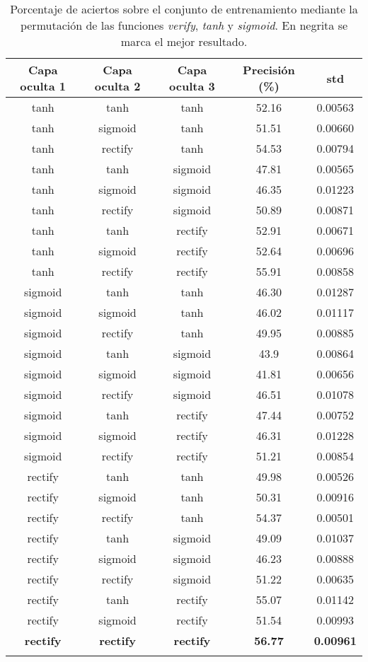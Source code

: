 \begin{table}[htp]
\caption{Porcentaje de aciertos sobre el conjunto de entrenamiento mediante la permutación de las funciones \textit{verify}, \textit{tanh} y \textit{sigmoid}. En negrita se marca el mejor resultado.}
\label{tab:nonlinearities}
\centering
\begin{tabular}{c c c c c}

\toprule
\textbf{Capa oculta 1} & \textbf{Capa oculta 2} & \textbf{Capa oculta 3} & \textbf{Precisión (\%)} & \textbf{std} \\
\midrule
tanh & tanh & tanh & 52.16 & 0.00563   \\
tanh & sigmoid & tanh & 51.51 & 0.00660   \\
tanh & rectify & tanh & 54.53 & 0.00794   \\
tanh & tanh & sigmoid & 47.81 & 0.00565   \\
tanh & sigmoid & sigmoid & 46.35 & 0.01223   \\
tanh & rectify & sigmoid & 50.89 & 0.00871   \\
tanh & tanh & rectify & 52.91 & 0.00671   \\
tanh & sigmoid & rectify & 52.64 & 0.00696   \\
tanh & rectify & rectify & 55.91 & 0.00858   \\
sigmoid & tanh & tanh & 46.30 & 0.01287   \\
sigmoid & sigmoid & tanh & 46.02 & 0.01117   \\
sigmoid & rectify & tanh & 49.95 & 0.00885   \\
sigmoid & tanh & sigmoid & 43.9 & 0.00864   \\
sigmoid & sigmoid & sigmoid & 41.81 & 0.00656   \\
sigmoid & rectify & sigmoid & 46.51 & 0.01078   \\
sigmoid & tanh & rectify & 47.44 & 0.00752   \\
sigmoid & sigmoid & rectify & 46.31 & 0.01228   \\
sigmoid & rectify & rectify & 51.21 & 0.00854   \\
rectify & tanh & tanh & 49.98 & 0.00526   \\
rectify & sigmoid & tanh & 50.31 & 0.00916   \\
rectify & rectify & tanh & 54.37 & 0.00501   \\
rectify & tanh & sigmoid & 49.09 & 0.01037   \\
rectify & sigmoid & sigmoid & 46.23 & 0.00888   \\
rectify & rectify & sigmoid & 51.22 & 0.00635   \\
rectify & tanh & rectify & 55.07 & 0.01142   \\
rectify & sigmoid & rectify & 51.54 & 0.00993   \\
\textbf{rectify} & \textbf{rectify} & \textbf{rectify} & \textbf{56.77} & \textbf{0.00961}   \\


\bottomrule\\
\end{tabular}
\end{table}





